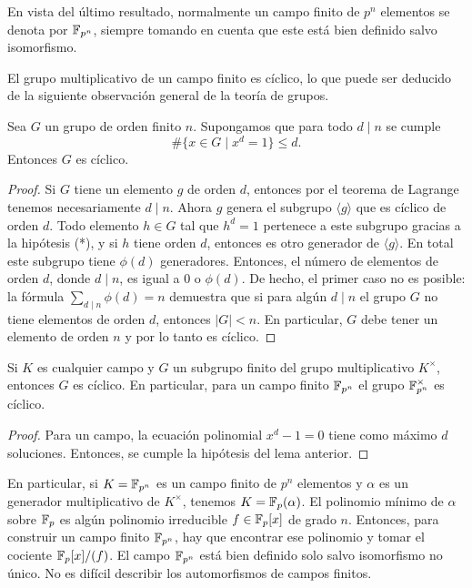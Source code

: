 En vista del último resultado, normalmente un campo finito de $p^n$ elementos se
denota por $\mathbb{F}_{p^n}$, siempre tomando en cuenta que este está bien definido
salvo isomorfismo.

\vspace{1em}

El grupo multiplicativo de un campo finito es cíclico, lo que puede ser deducido
de la siguiente observación general de la teoría de grupos.

\begin{lema}
  Sea $G$ un grupo de orden finito $n$. Supongamos que para todo
  $d\mid n$ se cumple
  \[ \tag{*} \# \{ x\in G \mid x^d = 1 \} \le d. \]
  Entonces $G$ es cíclico.

  \begin{proof}
    Si $G$ tiene un elemento $g$ de orden $d$, entonces por el teorema de
    Lagrange tenemos necesariamente $d \mid n$. Ahora $g$ genera el subgrupo
    $\langle g\rangle$ que es cíclico de orden $d$. Todo elemento $h\in G$ tal
    que $h^d = 1$ pertenece a este subgrupo gracias a la hipótesis (*), y si $h$
    tiene orden $d$, entonces es otro generador de $\langle g\rangle$. En total
    este subgrupo tiene $\phi (d)$ generadores. Entonces, el número de elementos
    de orden $d$, donde $d \mid n$, es igual a $0$ o $\phi (d)$. De hecho,
    el primer caso no es posible: la fórmula $\sum_{d\mid n} \phi (d) = n$
    demuestra que si para algún $d\mid n$ el grupo $G$ no tiene elementos de
    orden $d$, entonces $|G| < n$. En particular, $G$ debe tener un elemento de
    orden $n$ y por lo tanto es cíclico.
  \end{proof}
\end{lema}

\begin{corolario}
  \label{cor:grupo-multiplicativo-de-campo-finito}
  Si $K$ es cualquier campo y $G$ un subgrupo finito del grupo multiplicativo
  $K^\times$, entonces $G$ es cíclico. En particular, para un campo finito
  $\mathbb{F}_{p^n}$ el grupo $\mathbb{F}_{p^n}^\times$ es cíclico.

  \begin{proof}
    Para un campo, la ecuación polinomial $x^d - 1 = 0$ tiene como
    máximo $d$ soluciones. Entonces, se cumple la hipótesis
    del lema anterior.
  \end{proof}
\end{corolario}

En particular, si $K = \mathbb{F}_{p^n}$ es un campo finito de $p^n$ elementos y
$\alpha$ es un generador multiplicativo de $K^\times$, tenemos
$K = \mathbb{F}_p (\alpha)$. El polinomio mínimo de $\alpha$ sobre $\mathbb{F}_p$
es algún polinomio irreducible $f \in \mathbb{F}_p [x]$ de grado $n$.
Entonces, para construir un campo finito $\mathbb{F}_{p^n}$, hay que encontrar
ese polinomio y tomar el cociente $\mathbb{F}_p [x] / (f)$. El campo $\mathbb{F}_{p^n}$
está bien definido solo salvo isomorfismo no único. No es difícil describir
los automorfismos de campos finitos.

